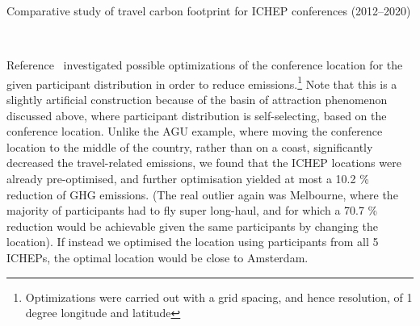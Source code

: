 \documentclass[../SustainableHEP.tex]{subfiles}
\begin{document}
\begin{casestudy}{Comparative study of travel carbon footprint for ICHEP conferences (2012--2020)}
\begin{center}
    \captionsetup{type=figure}
    \\
    \caption[Emissions per distance for two different ICHEP editions]{Emissions per distance for ICHEP Valencia and ICHEP Seoul shown in \tCdOe\ (left axis) and as share of the total emissions. Additionally, the emissions caused by the 17~\% and 36~\% of participants travelling furthest are shaded in green.}\label{fig:EmmPerDistance}
\end{center}

Reference~\cite{RefAGU} investigated possible optimizations of the conference location for the given participant distribution in order to reduce emissions.\footnote{Optimizations were carried out with a grid spacing, and hence resolution, of 1 degree longitude and latitude}  Note that this is a slightly artificial construction because of the basin of attraction phenomenon discussed above, where participant distribution is self-selecting, based on the conference location. Unlike the AGU example, where moving the conference location to the middle of the country, rather than on a coast, significantly decreased the travel-related emissions, we found that the ICHEP locations were already pre-optimised, and further optimisation yielded at most a 10.2 \% reduction of GHG emissions.  (The real outlier again was Melbourne, where the majority of participants had to fly super long-haul, and for which a 70.7 \% reduction would be achievable given the same participants by changing the location).  If instead we optimised the location using participants from all 5 ICHEPs, the optimal location would be close to Amsterdam.


\end{casestudy}
\end{document}

